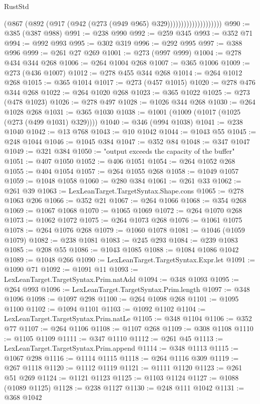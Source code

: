 \begin{lexlean}{RustStd}
\begin{coremodule}
{\begin{coremodule}
{{{{{{{{{{{{{{{{{{{{{{{{{{{{{{{{{{{{{{{{{{{{{{{{{{{{{{{{{{{{{{{{{{{{{{{{{{{{{{{{{{{{{                                  (@867 (@892 (@917 (@942 (@273 (@949 @965) @329))))))))))))))))))))
@990 := @385 (@387 @988)
@991 := @238 @990
@992 := @259 @345
@993 := @352 @71
@994 := @992 @993
@995 := @302 @319
@996 := @292 @995
@997 := @388 @996
@999 := @261 @27 @269
@1001 := @273 (@997 @999)
@1004 := @278 @434 @344 @268
@1006 := @264 @1004 @268
@1007 := @365 @1006
@1009 := @273 (@436 @1007)
@1012 := @278 @455 @344 @268
@1014 := @264 @1012 @268
@1015 := @365 @1014
@1017 := @273 (@457 @1015)
@1020 := @278 @476 @344 @268
@1022 := @264 @1020 @268
@1023 := @365 @1022
@1025 := @273 (@478 @1023)
@1026 := @278 @497
@1028 := @1026 @344 @268
@1030 := @264 @1028 @268
@1031 := @365 @1030
@1038 := @1001 (@1009 (@1017 (@1025 (@273 (@499 @1031) @329))))
@1040 := @346 (@994 @1038)
@1041 := @238 @1040
@1042 := @13 @768
@1043 := @10 @1042
@1044 := @1043 @55
@1045 := @248 @1044
@1046 := @1045 @384
@1047 := @352 @84
@1048 := @347 @1047
@1049 := @321 @384
@1050 := "output exceeds the capacity of the buffer"
@1051 := @407 @1050
@1052 := @406 @1051
@1054 := @264 @1052 @268
@1055 := @404 @1054
@1057 := @264 @1055 @268
@1058 := @1049 @1057
@1059 := @1048 @1058
@1060 := @280 @384
@1061 := @261 @33
@1062 := @261 @39
@1063 := LexLeanTarget.TargetSyntax.Shape.cons
@1065 := @278 @1063 @206
@1066 := @352 @21
@1067 := @264 @1066
@1068 := @354 @268
@1069 := @1067 @1068
@1070 := @1065 @1069
@1072 := @264 @1070 @268
@1073 := @1062 @1072
@1075 := @264 @1073 @268
@1076 := @1061 @1075
@1078 := @264 @1076 @268
@1079 := @1060 @1078
@1081 := @1046 (@1059 @1079)
@1082 := @238 @1081
@1083 := @245 @293
@1084 := @239 @1083
@1085 := @208 @55
@1086 := @1043 @1085
@1088 := @1084 @1086 @1042
@1089 := @1048 @266
@1090 := LexLeanTarget.TargetSyntax.Expr.let
@1091 := @1090 @71
@1092 := @1091 @11
@1093 := LexLeanTarget.TargetSyntax.Prim.natAdd
@1094 := @348 @1093
@1095 := @264 @993
@1096 := LexLeanTarget.TargetSyntax.Prim.length
@1097 := @348 @1096
@1098 := @1097 @298
@1100 := @264 @1098 @268
@1101 := @1095 @1100
@1102 := @1094 @1101
@1103 := @1092 @1102
@1104 := LexLeanTarget.TargetSyntax.Prim.natLe
@1105 := @348 @1104
@1106 := @352 @77
@1107 := @264 @1106
@1108 := @1107 @268
@1109 := @308 @1108
@1110 := @1105 @1109
@1111 := @347 @1110
@1112 := @261 @45
@1113 := LexLeanTarget.TargetSyntax.Prim.append
@1114 := @348 @1113
@1115 := @1067 @298
@1116 := @1114 @1115
@1118 := @264 @1116 @309
@1119 := @267 @1118
@1120 := @1112 @1119
@1121 := @1111 @1120
@1123 := @261 @51 @269
@1124 := @1121 @1123
@1125 := @1103 @1124
@1127 := @1088 (@1089 @1125)
@1128 := @238 @1127
@1130 := @248 @111 @1042
@1131 := @368 @1042
}}}}}}}}}}}}}}}}}}}}}}}}}}}}}}}}}}}}}}}}}}}}}}}}}}}}}}}}}}}}}}}}}}}}}}}}}}}}}}}}}}}}}
\end{coremodule}}
\end{coremodule}
\end{lexlean}
